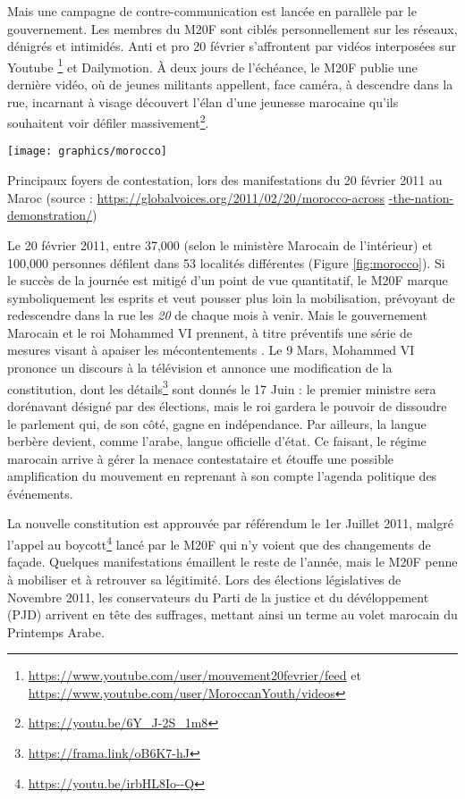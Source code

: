 \documentclass[symmetric,justified,marginals=raggedouter]{tufte-book}
\begin{document}
Mais une campagne de contre-communication est lancée en parallèle par le gouvernement. Les membres du M20F sont ciblés personnellement sur les réseaux, dénigrés et intimidés. Anti et pro 20 février s'affrontent par vidéos interposées sur Youtube \footnote{\url{https://www.youtube.com/user/mouvement20fevrier/feed} et \url{https://www.youtube.com/user/MoroccanYouth/videos}} et Dailymotion. À deux jours de l'échéance, le M20F publie une dernière vidéo, où de jeunes militants appellent, face caméra, à descendre dans la rue, incarnant à visage découvert l'élan d'une jeunesse marocaine qu'ils souhaitent voir défiler massivement\footnote{\url{https://youtu.be/6Y_J-2S_1m8}}.

\begin{marginfigure}%
  \texttt{[image: graphics/morocco]}
  \vspace*{0.2cm}  
  \caption{Principaux foyers de contestation, lors des manifestations du 20 février 2011 au Maroc (source : \url{ https://globalvoices.org/2011/02/20/morocco-across} \url{-the-nation-demonstration/}) }
  \label{fig:morocco}
\end{marginfigure} 

Le 20 février 2011, entre 37,000 (selon le ministère Marocain de l'intérieur) et 100,000 personnes défilent dans 53 localités différentes (Figure \ref{fig:morocco}). Si le succès de la journée est mitigé d'un point de vue quantitatif, le M20F marque symboliquement les esprits et veut pousser plus loin la mobilisation, prévoyant de redescendre dans la rue les \textit{20} de chaque mois à venir. Mais le gouvernement Marocain et le roi Mohammed VI prennent, à titre préventifs une série de mesures visant à apaiser les mécontentements \citep{desrues_mouvement_2012}. Le 9 Mars, Mohammed VI prononce un discours à la télévision et annonce une modification de la constitution, dont les détails\footnote{\url{https://frama.link/oB6K7-hJ}} sont donnés le 17 Juin : le premier ministre sera dorénavant désigné par des élections, mais le roi gardera le pouvoir de dissoudre le parlement qui, de son côté, gagne en indépendance. Par ailleurs, la langue berbère devient, comme l'arabe, langue officielle d'état. Ce faisant, le régime marocain arrive à gérer la menace contestataire et étouffe une possible amplification du mouvement en reprenant à son compte l'agenda politique des événements. 

La nouvelle constitution est approuvée par référendum le 1er Juillet 2011, malgré l'appel au boycott\footnote{\url{https://youtu.be/irbHL8Io--Q}} lancé par le M20F qui n'y voient que des changements de façade. Quelques manifestations émaillent le reste de l'année, mais le M20F penne à mobiliser et à retrouver sa légitimité. Lors des élections législatives de Novembre 2011, les conservateurs du Parti de la justice et du dévéloppement (PJD) arrivent en tête des suffrages, mettant ainsi un terme au volet marocain du Printemps Arabe.
\end{document}
